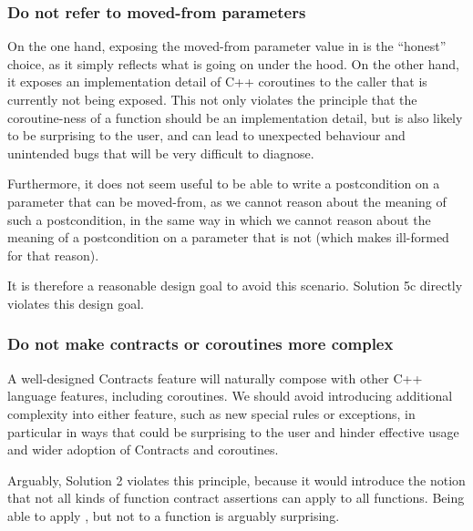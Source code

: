 \subsubsection{Do not refer to moved-from  parameters}

On the one hand, exposing the moved-from parameter value in  is the ``honest'' choice, as it simply reflects what is going on under the hood. On the other hand, it exposes an implementation detail of C++ coroutines to the caller that is currently not being exposed. This not only violates the principle that the coroutine-ness of a function should be an implementation detail, but is also likely to be surprising to the user, and can lead to unexpected behaviour and unintended bugs that will be very difficult to diagnose.

Furthermore, it does not seem useful to be able to write a postcondition on a parameter that can be moved-from, as we cannot reason about the meaning of such a postcondition, in the same way in which we cannot reason about the meaning of a postcondition on a parameter that is not  (which \cite{P2900R8} makes ill-formed for that reason).

It is therefore a reasonable design goal to avoid this scenario. Solution 5c directly violates this design goal.
     

\subsubsection{Do not make contracts or coroutines more complex}

A well-designed Contracts feature will naturally compose with other C++ language features, including coroutines. We should avoid introducing additional complexity into either feature, such as new special rules or exceptions, in particular in ways that could be surprising to the user and hinder effective usage and wider adoption of Contracts and coroutines.

Arguably, Solution 2 violates this principle, because it would introduce the notion that not all kinds of function contract assertions can apply to all functions. Being able to apply , but not  to a function is arguably surprising.

